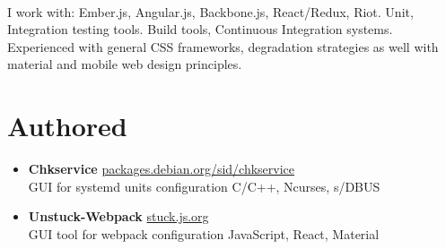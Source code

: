 \documentclass[a4paper,11pt]{article}
\begin{document}
{\paragraph{} I work with: Ember.js, Angular.js, Backbone.js, React/Redux, Riot. Unit, Integration testing tools. Build tools, Continuous Integration systems. Experienced with general CSS frameworks, degradation strategies as well with material and mobile web design principles.
%
%
%
%
\section*{Authored}

\begin{itemize}[itemsep=4pt,label=]
  \item \textbf{Chkservice} \href{https://packages.debian.org/sid/chkservice}{packages.debian.org/sid/chkservice}\\
    GUI for systemd units configuration  \hfill  C/C++, Ncurses, s/DBUS

  \item \textbf{Unstuck-Webpack} \href{https://stuck.js.org}{stuck.js.org}\\
    GUI tool for webpack configuration \hfill  JavaScript, React, Material


\end{itemize}}
\end{document}
